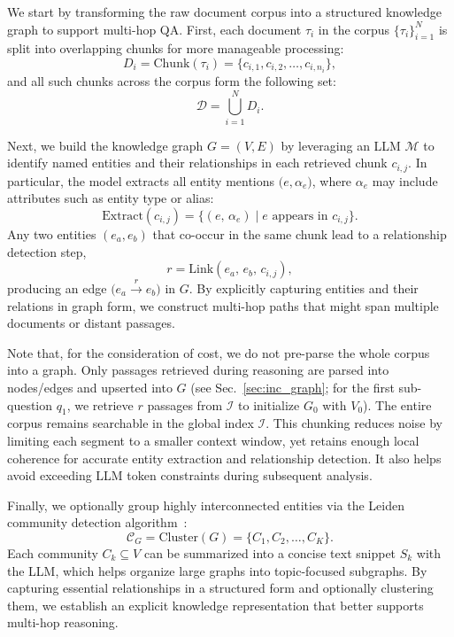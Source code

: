 \documentclass[runningheads]{llncs}
\begin{document}
We start by transforming the raw document corpus into a structured knowledge graph to support multi-hop QA. First, each document \(\tau_i\) in the corpus \(\{\tau_i\}_{i=1}^N\) is split into overlapping chunks for more manageable processing:
\begin{equation}
\label{eq:chunking}
D_i = \mathrm{Chunk}(\tau_i) = \bigl\{c_{i,1}, c_{i,2}, \ldots, c_{i,n_i}\bigr\},
\end{equation}
and all such chunks across the corpus form the following set: 
\begin{equation}
\mathcal{D} = \bigcup_{i=1}^{N} D_i.
\end{equation}


Next, we build the knowledge graph \(G=(V,E)\) by leveraging an LLM \(\mathcal{M}\) to identify named entities and their relationships in each retrieved chunk \(c_{i,j}\). In particular, the model extracts all entity mentions \(\bigl(e, \alpha_e\bigr)\), where \(\alpha_e\) may include attributes such as entity type or alias:
\begin{equation}
\mathrm{Extract}(c_{i,j}) \!
= \!\bigl\{(e,\, \alpha_e) \!\mid\! e \text{ appears in } c_{i,j}\bigr\}.
\end{equation}
Any two entities \((e_a,e_b)\) that co-occur in the same chunk lead to a relationship detection step,
\begin{equation}
r = \mathrm{Link}(e_a,\, e_b,\, c_{i,j}),
\end{equation}
producing an edge \(\bigl(e_a \xrightarrow{r} e_b\bigr)\) in \(G\). By explicitly capturing entities and their relations in graph form, we 
construct 
multi-hop paths that might span multiple documents or distant passages.

Note that, for the consideration of cost, we do not pre-parse the whole corpus into a graph. Only passages retrieved during reasoning are parsed into nodes/edges and upserted into \(G\) (see Sec.~\ref{sec:inc_graph}; for the first sub-question \(q_1\), we retrieve \(r\) passages from \(\mathcal{I}\) to initialize \(G_0\) with \(V_0\)). The entire corpus remains searchable in the global index \(\mathcal{I}\).
This chunking reduces noise by limiting each segment to a smaller context window, yet retains enough local coherence for accurate entity extraction and relationship detection. 
It also helps avoid exceeding LLM token constraints during subsequent analysis.

Finally, we optionally group highly interconnected entities via the Leiden community detection algorithm~\cite{traag2019louvain}:
\begin{equation}
\label{eq:community_detection}
\mathcal{C}_G = \mathrm{Cluster}(G) = \{C_1, C_2, \dots, C_K\}.
\end{equation}
Each community \(C_k \subseteq V\) can be summarized into a concise text snippet \(S_k\) with the LLM, which helps organize large graphs into topic-focused subgraphs. By capturing essential relationships in a structured form and optionally clustering them, we establish an explicit knowledge representation that better supports multi-hop reasoning. 
\end{document}
